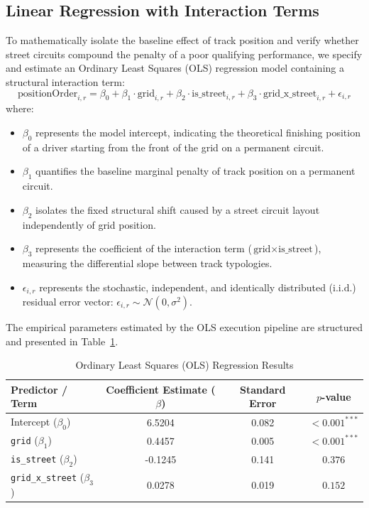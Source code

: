 \subsection{Linear Regression with Interaction Terms}
\label{subsec:ols_specification}

To mathematically isolate the baseline effect of track position and verify whether street circuits compound the penalty of a poor qualifying performance, we specify and estimate an Ordinary Least Squares (OLS) regression model containing a structural interaction term:
\begin{equation}
\text{positionOrder}_{i,r} = \beta_0 + \beta_1 \cdot \text{grid}_{i,r} + \beta_2 \cdot \text{is\_street}_{i,r} + \beta_3 \cdot \text{grid\_x\_street}_{i,r} + \epsilon_{i,r}
\end{equation}
where:
\begin{itemize}
    \item $\beta_0$ represents the model intercept, indicating the theoretical finishing position of a driver starting from the front of the grid on a permanent circuit.
    \item $\beta_1$ quantifies the baseline marginal penalty of track position on a permanent circuit.
    \item $\beta_2$ isolates the fixed structural shift caused by a street circuit layout independently of grid position.
    \item $\beta_3$ represents the coefficient of the interaction term ($\text{grid} \times \text{is\_street}$), measuring the differential slope between track typologies.
    \item $\epsilon_{i,r}$ represents the stochastic, independent, and identically distributed ($\text{i.i.d.}$) residual error vector: $\epsilon_{i,r} \sim \mathcal{N}(0, \sigma^2)$.
\end{itemize}

\noindent The empirical parameters estimated by the OLS execution pipeline are structured and presented in Table~\ref{tab:ols_results}.

\begin{table}[h!]
\centering
\caption{Ordinary Least Squares (OLS) Regression Results}
\label{tab:ols_results}
\begin{tabular}{lccc}
\toprule
\textbf{Predictor / Term} & \textbf{Coefficient Estimate ($\beta$)} & \textbf{Standard Error} & \textbf{$p$-value} \\
\midrule
Intercept ($\beta_0$)             & 6.5204   & 0.082 & $< 0.001^{***}$ \\
\texttt{grid} ($\beta_1$)          & 0.4457   & 0.005 & $< 0.001^{***}$ \\
\texttt{is\_street} ($\beta_2$)    & -0.1245  & 0.141 & $0.376$        \\
\texttt{grid\_x\_street} ($\beta_3$) & 0.0278 & 0.019 & $0.152$        \\
\bottomrule
\end{tabular}
\end{table}

